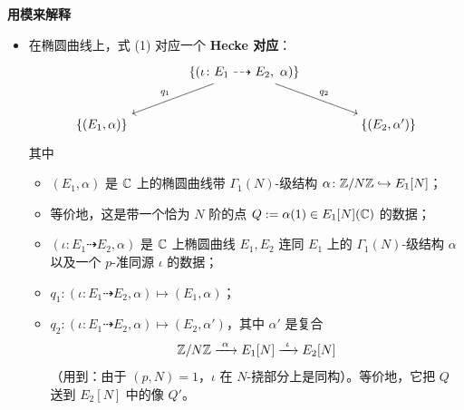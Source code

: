 \medskip
\noindent\textbf{用模来解释}
\begin{itemize}
\item 在椭圆曲线上，式 (1) 对应一个 \textbf{Hecke 对应}：
\[
\begin{tikzcd}[column sep=4em, row sep=2.4em]
& \{(\iota\colon E_1\dashrightarrow E_2,\ \alpha)\}\arrow[dl,"q_1"']\arrow[dr,"q_2"] &\\
\{(E_1,\alpha)\} & & \{(E_2,\alpha')\}
\end{tikzcd}
\]
其中
\begin{itemize}
\item $(E_1,\alpha)$ 是 $\mathbb{C}$ 上的椭圆曲线带 $\Gamma_1(N)$-级结构 $\alpha\colon\mathbb{Z}/N\mathbb{Z}\hookrightarrow E_1[N]$；
\item 等价地，这是带一个恰为 $N$ 阶的点 $Q:=\alpha(1)\in E_1[N](\mathbb{C})$ 的数据；
\item $(\iota\colon E_1\dashrightarrow E_2,\alpha)$ 是 $\mathbb{C}$ 上椭圆曲线 $E_1,E_2$ 连同 $E_1$ 上的 $\Gamma_1(N)$-级结构 $\alpha$ 以及一个 $p$-准同源 $\iota$ 的数据；
\item $q_1\colon(\iota\colon E_1\dashrightarrow E_2,\alpha)\mapsto(E_1,\alpha)$；
\item $q_2\colon(\iota\colon E_1\dashrightarrow E_2,\alpha)\mapsto(E_2,\alpha')$，其中 $\alpha'$ 是复合
\[
\mathbb{Z}/N\mathbb{Z}\xrightarrow{\ \alpha\ } E_1[N]\xrightarrow{\ \iota\ } E_2[N]
\]
（用到：由于 $(p,N)=1$，$\iota$ 在 $N$-挠部分上是同构）。等价地，它把 $Q$ 送到 $E_2[N]$ 中的像 $Q'$。
\end{itemize}
\end{itemize}

